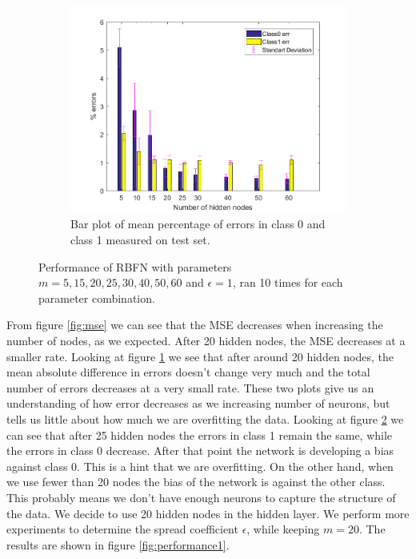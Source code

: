 \documentclass[a4paper, 11pt]{article}
\begin{document}
\begin{figure}[h!]
\begin{subfigure}[t]{0.32\textwidth}
        \label{fig:errorplot}
    \end{subfigure}
    \hfill %
    \begin{subfigure}[t]{0.32\textwidth}
        \includegraphics[width=\textwidth]{../figures/perf/errorbar_m(5-60)_e(10-10).png}
        \caption{Bar plot of mean percentage of errors in class 0 and class 1 measured on test set.}
        \label{fig:errorbar}
    \end{subfigure}
    \caption{Performance of RBFN with parameters $m = 5,15,20,25,30,40,50,60$ and $\epsilon = 1$, ran 10  times for each parameter combination.}\label{fig:performance}
\end{figure}


From figure \ref{fig:mse} we can see that the MSE decreases when increasing the number of nodes, as we expected. After 20 hidden nodes, the MSE decreases at a smaller rate. Looking at figure \ref{fig:errorplot} we see that after around 20 hidden nodes, the mean absolute difference in errors doesn't change very much and the total number of errors decreases at a very small rate. These two plots give us an understanding of how error decreases as we increasing number of neurons, but tells us little about how much we are overfitting the data. Looking at figure \ref{fig:errorbar} we can see that after 25 hidden nodes the errors in class 1 remain the same, while the errors in class 0 decrease. After that point the network is developing a bias against class 0. This is a hint that we are overfitting. On the other hand, when we use fewer than 20 nodes the bias of the network is against the other class. This probably means we don't have enough neurons to capture the structure of the data. We decide to use 20 hidden nodes in the hidden layer. We perform more experiments to determine the spread coefficient $\epsilon$, while keeping $m = 20$. The results are shown in figure \ref{fig:performance1}.
\end{document}
